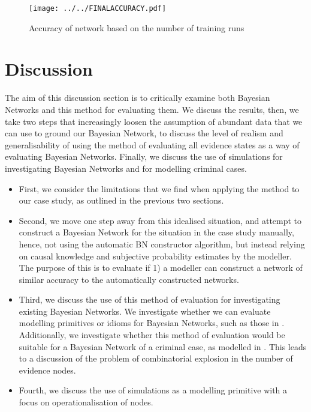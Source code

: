 \documentclass[12pt]{article}
\begin{document}
\begin{figure}[htbp]
\begin{center}
\texttt{[image: ../../FINALACCURACY.pdf]}
\caption{Accuracy of network based on the number of training runs}
\label{girl}
\end{center}
\end{figure}




\newpage



\section{Discussion}
The aim of this discussion section is to critically examine both Bayesian Networks and this method for evaluating them. We discuss the results, then, we take two steps that increasingly loosen the assumption of abundant data that we can use to ground our Bayesian Network, to discuss the level of realism and generalisability of using the method of evaluating all evidence states as a way of evaluating Bayesian Networks. Finally, we discuss the use of simulations for investigating Bayesian Networks and for modelling criminal cases.

\begin{itemize}
\item First, we consider the limitations that we find when applying the method to our case study, as outlined in the previous two sections. 
\item Second, we move one step away from this idealised situation, and attempt to construct a Bayesian Network for the situation in the case study manually, hence, not using the automatic BN constructor algorithm, but instead relying on causal knowledge and subjective probability estimates by the modeller. The purpose of this is to evaluate if 1) a modeller can construct a network of similar accuracy to the automatically constructed networks. 
\item Third, we discuss the use of this method of evaluation for investigating existing Bayesian Networks. We investigate whether we can evaluate modelling primitives or idioms for Bayesian Networks, such as those in \citep{deZoete2019}. Additionally, we investigate whether this method of evaluation would be suitable for a Bayesian Network of a criminal case, as modelled in \citep{vanLeeuwen2019}. This leads to a discussion of the problem of combinatorial explosion in the number of evidence nodes.
\item Fourth, we discuss the use of simulations as a modelling primitive with a focus on operationalisation of nodes.

\end{itemize}
\end{document}
